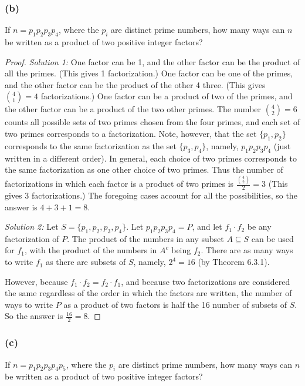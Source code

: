 \documentclass[14pt]{extarticle}
\newcommand{\dps}{\displaystyle}
\begin{document}
\subsubsection{(b)}
If \(n = p_1 p_2 p_3 p_4\), where the \(p_i\) are distinct prime numbers, how many ways can \(n\) be written as a 
product of two positive integer factors?

\begin{proof}
{\it Solution 1:} One factor can be 1, and the other factor can be the product of all the primes. (This gives 1 
factorization.) One factor can be one of the primes, and the other factor can be the product of the other 4 three. (This 
gives \(\binom{4}{1} = 4\) factorizations.) One factor can be a product of two of the primes, and the other factor can be a 
product of the two other primes. The number \(\binom{4}{2} = 6\) counts all possible sets of two primes chosen from the 
four primes, and each set of two primes corresponds to a factorization. Note, however, that the set \(\{p_1, p_2\}\) 
corresponds to the same factorization as the set \(\{p_3, p_4\}\), namely, \(p_1 p_2 p_3 p_4\) (just written in a 
different order). In general, each choice of two primes corresponds to the same factorization as one other choice of 
two primes. Thus the number of factorizations in which each factor is a product of two primes is \(\dps\frac{\binom{4}{2}}
{2} = 3\) (This gives 3 factorizations.) The foregoing cases account for all the possibilities, so the answer is 
\(4 + 3 + 1 = 8\).

{\it Solution 2:} Let \(S = \{p_1, p_2, p_3, p_4\}\). Let \(p_1 p_2 p_3 p_4 = P\), and let \(f_1 \cdot f_2\) be any 
factorization of \(P\). The product of the numbers in any subset \(A \subseteq S\) can be used for \(f_1\), with the 
product of the numbers in \(A^c\) being \(f_2\). There are as many ways to write \(f_1\) as there are subsets of \(S\), 
namely, \(2^4 = 16\) (by Theorem 6.3.1).

However, because \(f_1 \cdot f_2 = f_2 \cdot f_1\), and because two factorizations are considered the same regardless of the 
order in which the factors are written, the number of ways to write \(P\) as a product of two factors is half the 16 number 
of subsets of \(S\). So the answer is \(\frac{16}{2} = 8\).
\end{proof}

\subsubsection{(c)}
If \(n = p_1 p_2 p_3 p_4 p_5\), where the \(p_i\) are distinct prime numbers, how many ways can \(n\) be written 
as a product of two positive integer factors?
\end{document}
